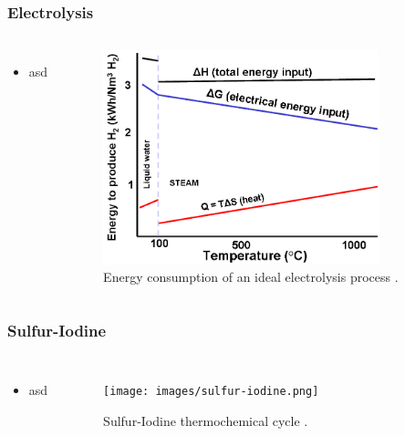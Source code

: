 \begin{frame}
\frametitle{Electrolysis}
\begin{columns}
	\column[t]{5cm}
	\begin{itemize}
		\item asd
	\end{itemize}

    \column[t]{5cm}
	\begin{figure}[htbp!]
		\begin{center}
			\includegraphics[height=6.2cm]{images/ele-curve.png}
		\end{center}
		\caption{Energy consumption of an ideal electrolysis process \cite{hi2h2_highly_2007}.}
	\end{figure}
\end{columns}
\end{frame}

\begin{frame}
\frametitle{Sulfur-Iodine}
\begin{columns}
	\column[t]{5cm}
	\begin{itemize}
		\item asd
	\end{itemize}

    \column[t]{5cm}
	\begin{figure}[htbp!]
		\begin{center}
			\texttt{[image: images/sulfur-iodine.png]}
		\end{center}
		\caption{Sulfur-Iodine thermochemical cycle \cite{cea_gas-cooled_2006}.}
	\end{figure}
\end{columns}
\end{frame}
